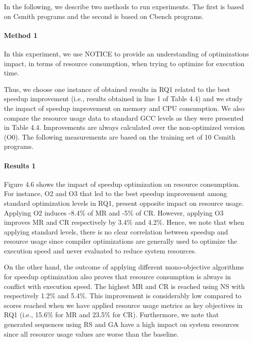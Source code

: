 In the following, we describe two methods to run experiments. The first is based on Csmith programs and the second is based on Cbench programs.

\paragraph{Method 1}

In this experiment, we use NOTICE to provide an understanding of optimizations impact, in terms of resource consumption, when trying to optimize for execution time. 

Thus, we choose one instance of obtained results in RQ1 related to the best speedup improvement (i.e., results obtained in line 1 of Table 4.4) and we study the impact of speedup improvement on memory and CPU consumption. We also compare the resource usage data to standard GCC levels as they were presented in Table 4.4. Improvements are always calculated over the non-optimized version (O0). The following measurements are based on the training set of 10 Csmith programs.

\paragraph{Results 1}

Figure 4.6 shows the impact of speedup optimization on resource consumption. For instance, O2 and O3 that led to the best speedup improvement among standard optimization levels in RQ1, present opposite impact on resource usage. Applying O2 induces -8.4\% of MR and -5\% of CR. However, applying O3 improves MR and CR respectively by 3.4\% and 4.2\%. Hence, we note that when applying standard levels, there is no clear correlation between speedup and resource usage since compiler optimizations are generally used to optimize the execution speed and never evaluated to reduce system resources.

On the other hand, the outcome of applying different mono-objective algorithms for speedup optimization also proves that resource consumption is always in conflict with execution speed. The highest MR and CR is reached using NS with respectively 1.2\% and 5.4\%. This improvement is considerably low compared to scores reached when we have applied resource usage metrics as key objectives in RQ1 (i.e., 15.6\% for MR and 23.5\% for CR). Furthermore, we note that generated sequences using RS and GA have a high impact on system resources since all resource usage values are worse than the baseline.

